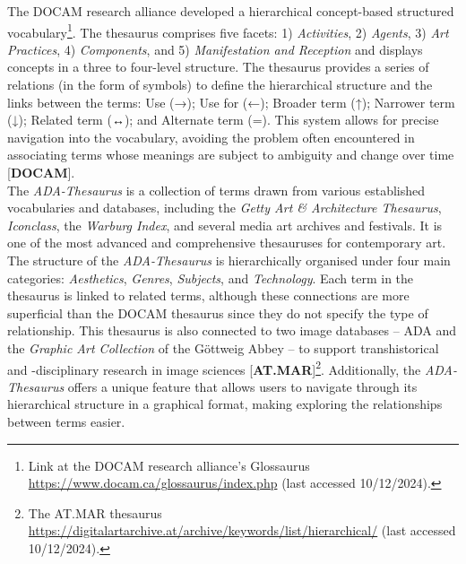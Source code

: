 The DOCAM research alliance developed a hierarchical concept-based structured vocabulary\footnote{Link at the DOCAM research alliance’s Glossaurus \url{https://www.docam.ca/glossaurus/index.php} (last accessed 10/12/2024).}. The thesaurus comprises five facets: 1) \textit{Activities}, 2) \textit{Agents}, 3) \textit{Art Practices}, 4) \textit{Components}, and 5) \textit{Manifestation and Reception} and displays concepts in a three to four-level structure. The thesaurus provides a series of relations (in the form of symbols) to define the hierarchical structure and the links between the terms: Use (→); Use for (←); Broader term (↑); Narrower term (↓); Related term (↔); and Alternate term (=). This system allows for precise navigation into the vocabulary, avoiding the problem often encountered in associating terms whose meanings are subject to ambiguity and change over time [\textbf{DOCAM}].\\
The \textit{ADA-Thesaurus} is a collection of terms drawn from various established vocabularies and databases, including the \textit{Getty Art \& Architecture Thesaurus}, \textit{Iconclass}, the \textit{Warburg Index}, and several media art archives and festivals. It is one of the most advanced and comprehensive thesauruses for contemporary art. The structure of the \textit{ADA-Thesaurus} is hierarchically organised under four main categories: \textit{Aesthetics}, \textit{Genres}, \textit{Subjects}, and \textit{Technology}. Each term in the thesaurus is linked to related terms, although these connections are more superficial than the DOCAM thesaurus since they do not specify the type of relationship. This thesaurus is also connected to two image databases – ADA and the \textit{Graphic Art Collection} of the Göttweig Abbey – to support transhistorical and -disciplinary research in image sciences [\textbf{AT.MAR}]\footnote{The AT.MAR thesaurus \url{https://digitalartarchive.at/archive/keywords/list/hierarchical/} (last accessed 10/12/2024).}. Additionally, the \textit{ADA-Thesaurus} offers a unique feature that allows users to navigate through its hierarchical structure in a graphical format, making exploring the relationships between terms easier.\\


